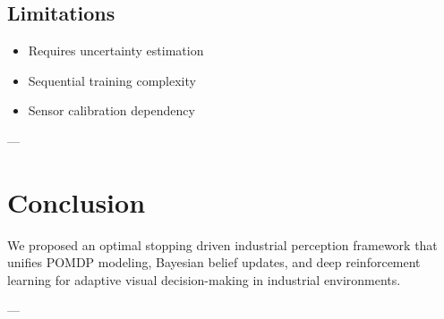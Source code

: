 \documentclass[journal]{IEEEtran}
\begin{document}
\subsection{Limitations}
\begin{itemize}
    \item Requires uncertainty estimation
    \item Sequential training complexity
    \item Sensor calibration dependency
\end{itemize}

---

\section{Conclusion}

We proposed an optimal stopping driven industrial perception framework that unifies POMDP modeling, Bayesian belief updates, and deep reinforcement learning for adaptive visual decision-making in industrial environments.

---
\end{document}
